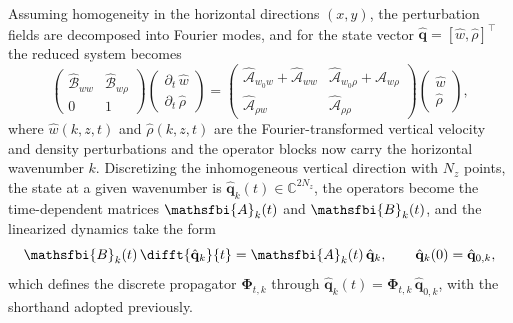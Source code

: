 Assuming homogeneity in the horizontal directions \((x,y)\), the perturbation fields are decomposed into Fourier modes, and for the state vector \(\hat{\boldsymbol{q}}=[\hat{w},\hat{\rho}]^{\top}\) the reduced system becomes
\begin{equation}
    \label{eq:vd_lti_dz_k}
    \begin{pmatrix}
        \widehat{\mathscr{B}}_{ww} & \widehat{\mathscr{B}}_{w\rho} \\
        0 & 1
    \end{pmatrix}
    \begin{pmatrix}
        \partial_t\, \hat{w} \\[4pt]
        \partial_t\,\hat{\rho}
    \end{pmatrix}
    =
    \begin{pmatrix}
        \widehat{\mathscr{A}}_{w_0w}+\widehat{\mathscr{A}}_{ww} & \widehat{\mathscr{A}}_{w_0\rho}+\widehat{\mathscr{A}}_{w\rho} \\[4pt]
        \widehat{\mathscr{A}}_{\rho w} & \widehat{\mathscr{A}}_{\rho\rho}
    \end{pmatrix}
    \begin{pmatrix}
        \hat{w} \\[4pt]
        \hat{\rho}
    \end{pmatrix},
\end{equation}
where \(\hat{w}(k,z,t)\) and \(\hat{\rho}(k,z,t)\) are the Fourier-transformed vertical velocity and density perturbations and the operator blocks now carry the horizontal wavenumber \(k\). Discretizing the inhomogeneous vertical direction with \(N_z\) points, the state at a given wavenumber is \(\hat{\mathbf{q}}_{k}(t)\in\mathbb{C}^{2N_z}\), the operators become the time-dependent matrices \(\mathsfbi{A}_{k}(t)\) and \(\mathsfbi{B}_{k}(t)\), and the linearized dynamics take the form
\begin{equation}
    \label{eq:vd_semidiscrete_system}
    \mathsfbi{B}_{k}(t)\,\difft{\hat{\mathbf{q}}_{k}}{t}
    =
    \mathsfbi{A}_{k}(t)\,\hat{\mathbf{q}}_{k},
    \qquad
    \hat{\mathbf{q}}_{k}(0)=\hat{\mathbf{q}}_{0,k},
\end{equation}
which defines the discrete propagator \(\boldsymbol{\Phi}_{t,k}\) through \(\hat{\mathbf{q}}_{k}(t)=\boldsymbol{\Phi}_{t,k}\,\hat{\mathbf{q}}_{0,k}\), with the shorthand adopted previously.